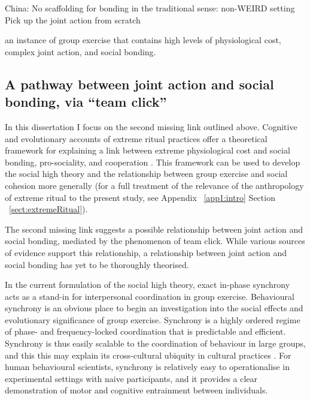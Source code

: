 \begin{CJK}{UTF8}{gbsn}
China:
No scaffolding for bonding in the traditional sense: non-WEIRD setting
Pick up the joint action from scratch


 an instance of group exercise that contains high levels of physiological cost, complex joint action, and social bonding.



\subsection{A pathway between joint action and social bonding, via ``team click''}
In this dissertation I focus on the second missing link outlined above. Cognitive and evolutionary accounts of extreme ritual practices offer a theoretical framework for explaining a link between extreme physiological cost and social bonding, pro-sociality, and cooperation \citep{Whitehouse2014,Whitehouse2017}. This framework can be used to develop the social high theory and the relationship between group exercise and social cohesion more generally (for a full treatment of the relevance of the anthropology of extreme ritual to the present study, see Appendix ~\ref{app1:intro} Section ~\ref{sect:extremeRitual}).

The second missing link suggests a possible relationship between joint action and social bonding, mediated by the phenomenon of team click.  While various sources of evidence support this relationship, a relationship between joint action and social bonding has yet to be thoroughly theorised.

In the current formulation of the social high theory, exact in-phase synchrony acts as a stand-in for interpersonal coordination in group exercise.  Behavioural synchrony is an obvious place to begin an investigation into the social effects and evolutionary significance of group exercise.  Synchrony is a highly ordered regime of phase- and frequency-locked coordination that is predictable and efficient. Synchrony is thus easily scalable to the coordination of behaviour in large groups, and this this may explain its cross-cultural ubiquity in cultural practices \citep{Dunbar2010,Tarr2016}.  For human behavioural scientists, synchrony is relatively easy to operationalise in experimental settings with naive participants, and it provides a clear demonstration of motor and cognitive entrainment between individuals.


\end{CJK}
